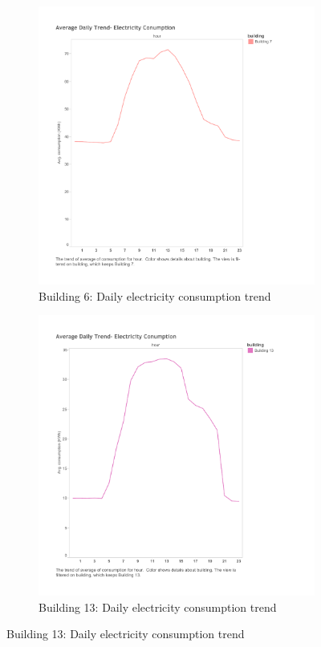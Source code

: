 \begin{figure}[h]
        \centering
        \begin{subfigure}[b]{0.45\textwidth}
                \includegraphics[width=\textwidth]{images/db6_elec.pdf}
                \caption{Building 6: Daily electricity consumption trend}
                \label{fig:elec6}
        \end{subfigure}%
        \begin{subfigure}[b]{0.45\textwidth}
                \includegraphics[width=\textwidth]{images/db13_elec.pdf}
                \caption{Building 13: Daily electricity consumption trend}
                \label{fig:elec13}
        \end{subfigure}
        

\end{figure}
